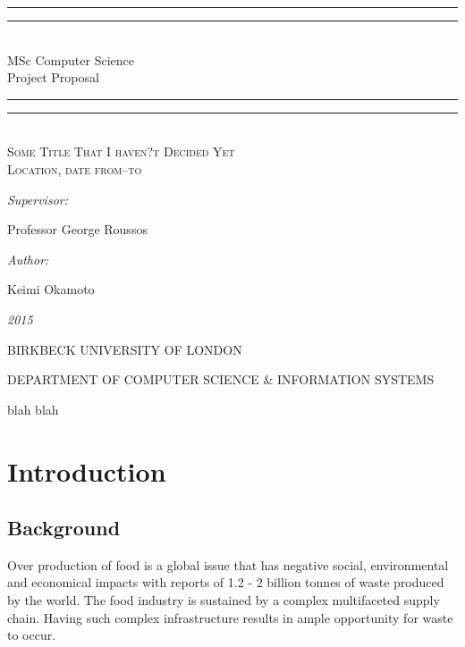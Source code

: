\documentclass[a4paper, 11pt]{article}
\newlength{\drop}
\begin{document}
  \begin{titlepage}
    \textheight
    \centering
    \vspace*{\baselineskip}
    \rule{\textwidth}{1.6pt}\vspace*{-\baselineskip}\vspace*{2pt}
    \rule{\textwidth}{0.4pt}\\[\baselineskip]
    {\Large{MSc Computer Science\\[0.3\baselineskip] }}
    {\huge{Project Proposal\\[0.3\baselineskip] }}
	
    \rule{\textwidth}{0.4pt}\vspace*{-\baselineskip}\vspace{3.2pt}
    \rule{\textwidth}{1.6pt}
    \\[\baselineskip]
    \scshape
    {\Large Some Title That I haven?t Decided Yet \\}
    Location, date from--to\par
    \vspace*{2\baselineskip}
    {\normalsize\emph{Supervisor: }{\large Professor George Roussos\par}}
    {\normalsize\emph{Author: }{\large Keimi Okamoto\par}}
    
    {\itshape 2015}
    \vfill
    {\large BIRKBECK UNIVERSITY OF LONDON\par}
{\footnotesize DEPARTMENT OF COMPUTER SCIENCE \& INFORMATION SYSTEMS}\par
  \end{titlepage}
  
\tableofcontents
\clearpage

blah blah
\clearpage

\section{Introduction}

\subsection{Background}
Over production of food is a global issue that has negative social, environmental and economical impacts with reports of 1.2 - 2 billion tonnes of waste produced by the world. The food industry is sustained by a complex multifaceted supply chain. Having such complex infrastructure results in ample opportunity for waste to occur. 
\end{document}
